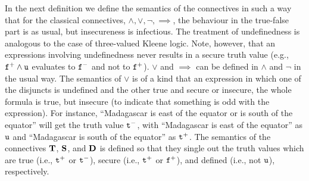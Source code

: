 \documentclass{\filespath jancl}
\newcommand{\undefined}{{\tt u}}
\newcommand{\twts}{{{\tt t}^+}}
\newcommand{\twfs}{{{\tt f}^+}}
\newcommand{\twti}{{{\tt t}^-}}
\newcommand{\twfi}{{{\tt f}^-}}
\newcommand{\twu}{{\tt u}}
\def\tf{{\bf D}}
\def\holds{{\bf T}}
\def\deft{{\bf S}}
\def\impl{\implies}\def\non{\neg}
\begin{document}
In the next definition we define the semantics of the connectives in
such a way that for the classical connectives, $\land, \lor, \non,
\impl$, the behaviour in the true-false part is as usual, but
insecureness is infectious. The treatment of undefinedness is
analogous to the case of three-valued Kleene logic. Note, however,
that an expressions involving undefinedness never results in a secure
truth value (e.g., $\twfs\land\twu$ evaluates to $\twfi$ and not to
$\twfs$). $\lor$ and $\impl$ can be defined in $\land$ and $\non$ in
the usual way. The semantics of $\lor$ is of a kind that an expression
in which one of the disjuncts is undefined and the other true and
secure or insecure, the whole formula is true, but insecure (to
indicate that something is odd with the expression). For instance,
``Madagascar is east of the equator or is south of the equator'' will
get the truth value $\twti$, with ``Madagascar is east of the
equator'' as $\twu$ and ``Madagascar is south of the equator'' as
$\twts$. The semantics of the connectives $\holds$, $\deft$, and $\tf$
is defined so that they single out the truth values which are true
(i.e., $\twts$ or $\twti$), secure (i.e., $\twts$ or $\twfs$), and
defined (i.e., not $\undefined$), respectively.
\end{document}
